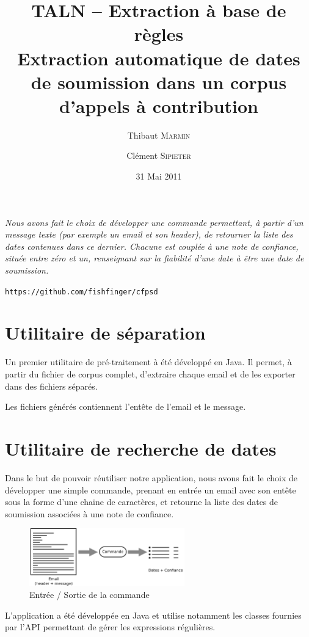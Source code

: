 \documentclass[a4paper,french,10pt]{article}
\title{\textbf{TALN -- Extraction à base de règles\\ \normalsize Extraction automatique de dates de soumission dans un corpus d'appels à contribution}}
\author{Thibaut \textsc{Marmin} \and Clément \textsc{Sipieter}}
\date{31 Mai 2011}
\begin{document}
\maketitle

\emph{Nous avons fait le choix de développer une commande permettant, à partir d'un message texte (par exemple un email et son header), de retourner la liste des dates contenues dans ce dernier. Chacune est couplée à une note de confiance, située entre zéro et un, renseignant sur la fiabilité d'une date à être une date de soumission.}

\begin{center}
\verb+https://github.com/fishfinger/cfpsd+
\end{center}

\section{Utilitaire de séparation}
Un premier utilitaire de pré-traitement à été développé en Java. Il permet, à partir du fichier de corpus complet, d'extraire chaque email et de les exporter dans des fichiers séparés.

Les fichiers générés contiennent l'entête de l'email et le message.

\section{Utilitaire de recherche de dates}
Dans le but de pouvoir réutiliser notre application, nous avons fait le choix de développer une simple commande, prenant en entrée un email avec son entête sous la forme d'une chaine de caractères, et retourne la liste des dates de soumission associées à une note de confiance.

\begin{figure}[H]
\centering
\includegraphics[width=0.6\textwidth]{files/archi}
\caption{Entrée / Sortie de la commande}
\end{figure}

L'application a été développée en Java et utilise notamment les classes fournies par l'API permettant de gérer les expressions régulières.
\end{document}
